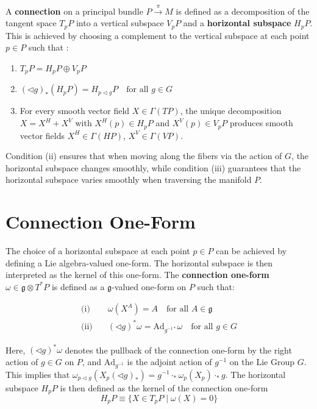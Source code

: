 A \textbf{connection} on a principal bundle \( P \xrightarrow{\pi} M \) is defined as a decomposition of the tangent space \( T_pP \) into a vertical subspace \( V_pP \) and a \textbf{horizontal subspace} \( H_pP \). This is achieved by choosing a complement to the vertical subspace at each point \( p \in P \) such that \cite{DudekEhreshmanntheoryconnectionprincipalbundlecompendiumphysicists2018}:
\newpage
\begin{enumerate}[label=(\roman*), labelsep=1em, leftmargin=2.5em]
  \item \( T_pP = H_pP \oplus V_pP \)

  \item \( (\triangleleft g)_*(H_pP) = H_{p \triangleleft g}P \quad \text{for all } g \in G \)

  \item For every smooth vector field \( X \in \Gamma(TP) \), the unique decomposition
  \( X = X^H + X^V \) with \( X^H(p) \in H_pP \) and \( X^V(p) \in V_pP \)
  produces smooth vector fields \( X^H \in \Gamma(HP) \), \( X^V \in \Gamma(VP) \).
\end{enumerate}

Condition (ii) ensures that when moving along the fibers via the action of \( G \), the horizontal subspace changes smoothly, while condition (iii) guarantees that the horizontal subspace varies smoothly when traversing the manifold \( P \).


\section{Connection One-Form}

The choice of a horizontal subspace at each point \( p \in P \) can be achieved by defining a Lie algebra-valued one-form. The horizontal subspace is then interpreted as the kernel of this one-form. The \textbf{connection one-form} \( \omega \in \mathfrak{g} \otimes T^*P \) is defined as a \( \mathfrak{g} \)-valued one-form on \( P \) such that:

\begin{align*}
  \text{(i)}\quad 
    & \omega(X^A) = A \quad \text{for all } A \in \mathfrak{g} \\
  \text{(ii)}\quad 
    & (\triangleleft g)^* \omega = \text{Ad}_{g^{-1*}} \omega \quad \text{for all } g \in G 
\end{align*}

Here, \( (\triangleleft g)^* \omega \) denotes the pullback of the connection one-form by the right action of \( g \in G \) on \( P \), and \( \text{Ad}_{g^{-1}} \) is the adjoint action of \( g^{-1} \) on the Lie Group \( G \). This implies that \( \omega_{p \triangleleft g}(X_p(\triangleleft g)_*) = g^{-1} \cdot_* \omega_p(X_p) \cdot_* g \). The horizontal subspace \( H_pP \) is then defined as the kernel of the connection one-form \cite{NakaharaGeometrytopologyphysics2005}
\[ H_pP \equiv \{ X \in T_pP \mid \omega(X)=0 \} \]

